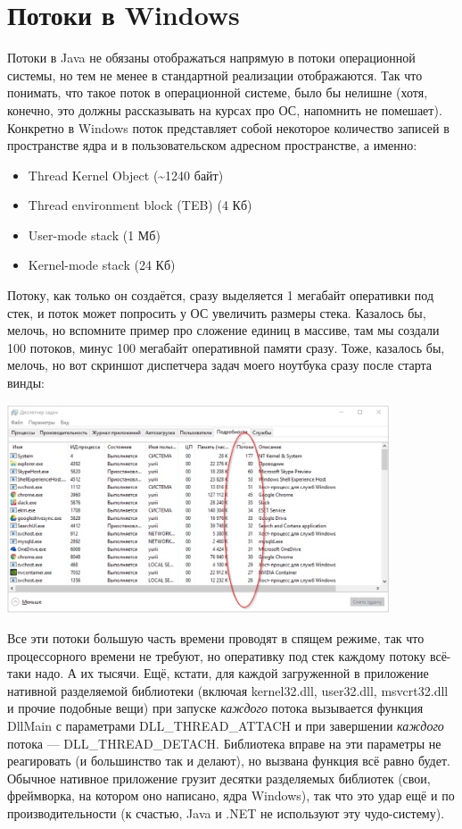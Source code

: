 \documentclass[a5paper]{article}
\begin{document}
\section{Потоки в Windows}

Потоки в Java не обязаны отображаться напрямую в потоки операционной системы, но тем не менее в стандартной реализации отображаются. Так что понимать, что такое поток в операционной системе, было бы нелишне (хотя, конечно, это должны рассказывать на курсах про ОС, напомнить не помешает). Конкретно в Windows поток представляет собой некоторое количество записей в пространстве ядра и в пользовательском адресном пространстве, а именно:

\begin{itemize}
	\item Thread Kernel Object (\textasciitilde1240 байт)
	\item Thread environment block (TEB) (4 Кб)
	\item User-mode stack (1 Мб)
	\item Kernel-mode stack (24 Кб)
\end{itemize}

Потоку, как только он создаётся, сразу выделяется 1 мегабайт оперативки под стек, и поток может попросить у ОС увеличить размеры стека. Казалось бы, мелочь, но вспомните пример про сложение единиц в массиве, там мы создали 100 потоков, минус 100 мегабайт оперативной памяти сразу. Тоже, казалось бы, мелочь, но вот скриншот диспетчера задач моего ноутбука сразу после старта винды:

\begin{center}
	\includegraphics[width=0.85\textwidth]{threadsEverywhere.png}
\end{center}

Все эти потоки большую часть времени проводят в спящем режиме, так что процессорного времени не требуют, но оперативку под стек каждому потоку всё-таки надо. А их тысячи. Ещё, кстати, для каждой загруженной в приложение нативной разделяемой библиотеки (включая kernel32.dll, user32.dll, msvcrt32.dll и прочие подобные вещи) при запуске \textit{каждого} потока вызывается функция DllMain с параметрами DLL\_THREAD\_ATTACH и при завершении \textit{каждого} потока --- DLL\_THREAD\_DETACH. Библиотека вправе на эти параметры не реагировать (и большинство так и делают), но вызвана функция всё равно будет. Обычное нативное приложение грузит десятки разделяемых библиотек (свои, фреймворка, на котором оно написано, ядра Windows), так что это удар ещё и по производительности (к счастью, Java и .NET не используют эту чудо-систему). 
\end{document}
